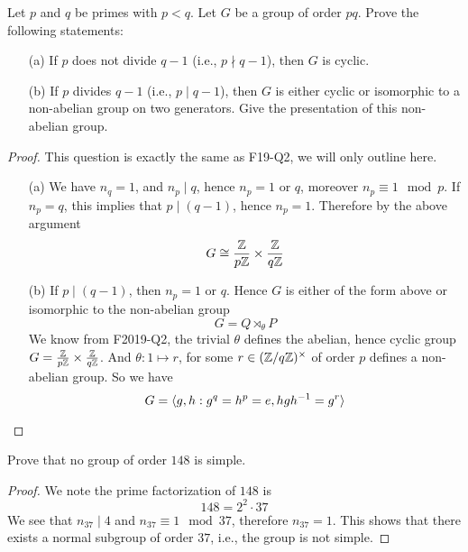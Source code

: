 \begin{prob}[S2013-Q2]
Let \( p \) and \( q \) be primes with \( p < q \). Let \( G \) be a group of order \( pq \). Prove the following statements:

\begin{itemize}
    \item[(a)] If \( p \) does not divide \( q - 1 \) (i.e., \( p \nmid q - 1 \)), then \( G \) is cyclic.

    \item[(b)] If \( p \) divides \( q - 1 \) (i.e., \( p \mid q - 1 \)), then \( G \) is either cyclic or isomorphic to a non-abelian group on two generators. Give the presentation of this non-abelian group.
\end{itemize}
\end{prob}
\begin{proof}
    This question is exactly the same as  F19-Q2, we will only outline here.
    \begin{itemize}
        \item[(a)] We have $n_q=1$, and $n_p\mid q$, hence $n_p=1$ or $q$, moreover $n_p\equiv 1\mod p$. If $n_p=q$, this implies that $p\mid(q-1)$, hence $n_p=1$. Therefore by the above argument
        \begin{equation*}
            G\cong\frac{\mathbb{Z}}{p\mathbb{Z}}\times\frac{\mathbb{Z}}{q\mathbb{Z}}
        \end{equation*}
        \item[(b)] If $p\mid(q-1)$, then $n_p=1$ or $q$. Hence $G$ is either of the form above or isomorphic to the non-abelian group 
        \begin{equation*}
            G=Q\rtimes_\theta P
        \end{equation*}
        We know from F2019-Q2, the trivial $\theta$ defines the abelian, hence cyclic group $G=\frac{\mathbb{Z}}{p\mathbb{Z}}\times\frac{\mathbb{Z}}{q\mathbb{Z}}$. And $\theta: 1\mapsto r$, for some $r\in(\mathbb{Z}/q\mathbb{Z})^\times$ of order $p$ defines a non-abelian group. So we have 
        \begin{equation*}
            G=\langle g,h: g^q=h^p=e, hgh^{-1}=g^r\rangle
        \end{equation*}
    \end{itemize}
\end{proof}

\begin{prob}[F2007-Q1]
    Prove that no group of order $148$ is simple.
\end{prob}
\begin{proof}
    We note the prime factorization of $148$ is 
    \begin{equation*}
        148=2^2\cdot 37
    \end{equation*}
    We see that $n_{37}\mid 4$ and $n_{37}\equiv 1\mod 37$, therefore $n_{37}=1$. This shows that there exists a normal subgroup of order $37$, i.e., the group is not simple.
\end{proof}


